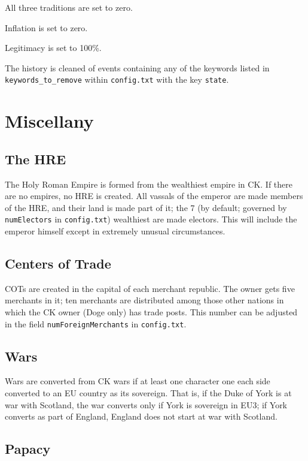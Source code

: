 \documentclass[12pt,ebook,oneside]{book}
\begin{document}
All three traditions are set to zero. 

Inflation is set to zero. 

Legitimacy is set to 100\%. 

The history is cleaned of
events containing any of the keywords listed in
\verb|keywords_to_remove|
within \verb|config.txt| with the key \verb|state|. 

\chapter{Miscellany}

\section{The HRE}

The Holy Roman Empire is formed from the wealthiest empire in CK. If
there are no empires, no HRE is created. All vassals of the emperor
are made members of the HRE, and their land is made part of it; the 7
(by default; governed by \verb|numElectors| in \verb|config.txt|)
wealthiest are made electors. This will include the emperor himself
except in extremely unusual circumstances. 

\section{Centers of Trade}

COTs are created in the capital of each merchant republic. The owner
gets five merchants in it; ten merchants are distributed among those
other nations in which the CK owner (Doge only) has trade posts. This
number can be adjusted in the field \verb|numForeignMerchants| in
\verb|config.txt|. 

\section{Wars}

Wars are converted from CK wars if at least one character one each
side converted to an EU country as its sovereign. That is, if the Duke
of York is at war with Scotland, the war converts only if York is
sovereign in EU3; if York converts as part of England, England does
not start at war with Scotland. 

\section{Papacy}
\end{document}

